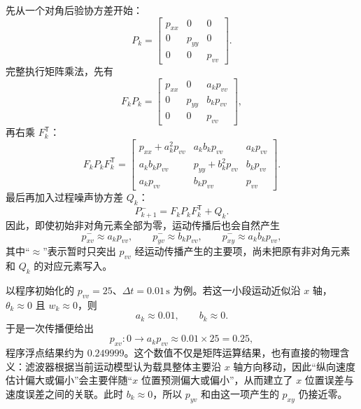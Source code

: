 \documentclass[UTF8,a4paper,11pt]{ctexart}
\newcommand{\prior}{^{-}}
\newcommand{\transpose}{^{\mathsf T}}
\begin{document}
先从一个对角后验协方差开始：
\begin{equation}
P_k=
\begin{bmatrix}
p_{xx}&0&0\\
0&p_{yy}&0\\
0&0&p_{vv}
\end{bmatrix}.
\end{equation}
完整执行矩阵乘法，先有
\begin{equation}
F_kP_k=
\begin{bmatrix}
p_{xx}&0&a_kp_{vv}\\
0&p_{yy}&b_kp_{vv}\\
0&0&p_{vv}
\end{bmatrix},
\end{equation}
再右乘 $F_k\transpose$：
\begin{equation}
F_kP_kF_k\transpose=
\begin{bmatrix}
p_{xx}+a_k^2p_{vv}&a_kb_kp_{vv}&a_kp_{vv}\\
a_kb_kp_{vv}&p_{yy}+b_k^2p_{vv}&b_kp_{vv}\\
a_kp_{vv}&b_kp_{vv}&p_{vv}
\end{bmatrix}.
\end{equation}
最后再加入过程噪声协方差 $Q_k$：
\begin{equation}
P_{k+1}\prior=F_kP_kF_k\transpose+Q_k.
\end{equation}
因此，即使初始非对角元素全部为零，运动传播后也会自然产生
\begin{equation}
p_{xv}\prior\approx a_kp_{vv},\qquad
p_{yv}\prior\approx b_kp_{vv},\qquad
p_{xy}\prior\approx a_kb_kp_{vv},
\end{equation}
其中“$\approx$”表示暂时只突出 $p_{vv}$ 经运动传播产生的主要项，尚未把原有非对角元素和 $Q_k$ 的对应元素写入。

以程序初始化的 $p_{vv}=25$、$\Delta t=0.01\,\mathrm{s}$ 为例。若这一小段运动近似沿 $x$ 轴，$\theta_k\approx0$ 且 $w_k\approx0$，则
\begin{equation}
a_k\approx0.01,\qquad b_k\approx0.
\end{equation}
于是一次传播便给出
\begin{equation}
p_{xv}:0\longrightarrow a_kp_{vv}\approx0.01\times25=0.25,
\end{equation}
程序浮点结果约为 $0.249999$。这个数值不仅是矩阵运算结果，也有直接的物理含义：滤波器根据当前运动模型认为载具整体主要沿 $x$ 轴方向移动，因此“纵向速度估计偏大或偏小”会主要伴随“$x$ 位置预测偏大或偏小”，从而建立了 $x$ 位置误差与速度误差之间的关联。此时 $b_k\approx0$，所以 $p_{yv}$ 和由这一项产生的 $p_{xy}$ 仍接近零。
\end{document}
